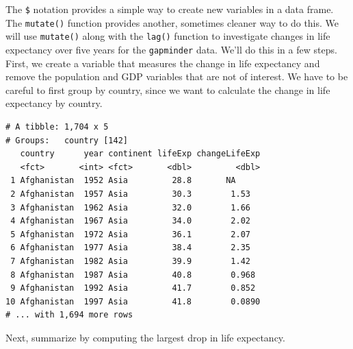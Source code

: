 \documentclass[]{krantz}
\makeatletter
\newenvironment{Shaded}{\begin{snugshade}}{\end{snugshade}}
\newcommand{\KeywordTok}[1]{\textcolor[rgb]{0.27,0.27,0.27}{\textbf{#1}}}
\newcommand{\DataTypeTok}[1]{\textcolor[rgb]{0.27,0.27,0.27}{#1}}
\newcommand{\StringTok}[1]{\textcolor[rgb]{0.5,0.5,0.5}{#1}}
\newcommand{\OperatorTok}[1]{\textcolor[rgb]{0.43,0.43,0.43}{\textbf{#1}}}
\newcommand{\NormalTok}[1]{#1}
\newenvironment{kframe}{%
\medskip{}
\setlength{\fboxsep}{.8em}
 \def\at@end@of@kframe{}%
 \ifinner\ifhmode%
  \def\at@end@of@kframe{\end{minipage}}%
  \begin{minipage}{\columnwidth}%
 \fi\fi%
 \def\FrameCommand##1{\hskip\@totalleftmargin \hskip-\fboxsep
 \colorbox{shadecolor}{##1}\hskip-\fboxsep
     \hskip-\linewidth \hskip-\@totalleftmargin \hskip\columnwidth}%
 \MakeFramed {\advance\hsize-\width
   \@totalleftmargin\z@ \linewidth\hsize
   \@setminipage}}%
 {\par\unskip\endMakeFramed%
 \at@end@of@kframe}
\renewenvironment{Shaded}{\begin{kframe}}{\end{kframe}}
\makeatother
\begin{document}
The \texttt{\$} notation provides a simple way to create new variables
in a data frame. The \texttt{mutate()} function provides another,
sometimes cleaner way to do this. We will use \texttt{mutate()} along
with the \texttt{lag()} function to investigate changes in life
expectancy over five years for the \texttt{gapminder} data. We'll do
this in a few steps. First, we create a variable that measures the
change in life expectancy and remove the population and GDP variables
that are not of interest. We have to be careful to first group by
country, since we want to calculate the change in life expectancy by
country.

\begin{Shaded}
\end{Shaded}

\begin{verbatim}
# A tibble: 1,704 x 5
# Groups:   country [142]
   country      year continent lifeExp changeLifeExp
   <fct>       <int> <fct>       <dbl>         <dbl>
 1 Afghanistan  1952 Asia         28.8       NA     
 2 Afghanistan  1957 Asia         30.3        1.53  
 3 Afghanistan  1962 Asia         32.0        1.66  
 4 Afghanistan  1967 Asia         34.0        2.02  
 5 Afghanistan  1972 Asia         36.1        2.07  
 6 Afghanistan  1977 Asia         38.4        2.35  
 7 Afghanistan  1982 Asia         39.9        1.42  
 8 Afghanistan  1987 Asia         40.8        0.968 
 9 Afghanistan  1992 Asia         41.7        0.852 
10 Afghanistan  1997 Asia         41.8        0.0890
# ... with 1,694 more rows
\end{verbatim}

Next, summarize by computing the largest drop in life expectancy.
\end{document}
